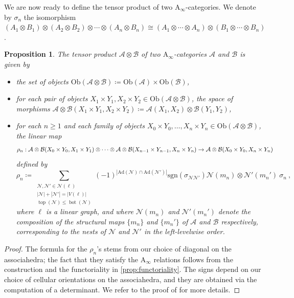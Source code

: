 \documentclass[twoside, 12pt]{amsart}
\newtheorem{proposition}[definition]{Proposition}
\theoremstyle{remark}
\DeclareMathOperator{\tp}{top}
\DeclareMathOperator{\bm}{bot}
\newcommand{\cat}[1]{\mathcal{#1}}
\newcommand{\gra}{\ell}
\begin{document}
We are now ready to define the tensor product of two $\mathrm{A}_\infty$-categories. We denote by $\sigma_n$ the isomorphism $(A_1 \otimes B_1)\otimes (A_2 \otimes B_2) \otimes \cdots \otimes (A_n \otimes B_n) \cong (A_1 \otimes \cdots \otimes A_n) \otimes (B_1 \otimes \cdots \otimes B_n)$. 

\begin{proposition} The \emph{tensor product} $\cat{A}\otimes \cat{B}$ of two $\mathrm{A}_\infty$-categories $\cat{A}$ and $\cat{B}$ is given by 
\begin{itemize}
  \item the set of objects $\mathrm{Ob}(\cat{A}\otimes \cat{B})\coloneqq \mathrm{Ob}(\cat{A})\times\mathrm{Ob}(\cat{B})$,
  \item for each pair of objects $X_1\times Y_1,X_2\times Y_2 \in \mathrm{Ob}(\cat{A}\otimes \cat{B})$, the space of morphisms $\cat{A}\otimes \cat{B}(X_1\times Y_1,X_2\times Y_2)\coloneqq \cat{A}(X_1,X_2)\otimes\cat{B}(Y_1,Y_2)$,
  \item for each $n\geq 1$ and each family of objects $X_0\times Y_0,\ldots,X_n\times Y_n \in \mathrm{Ob}(\cat{A}\otimes \cat{B})$, the linear map 
  \begin{equation*}
  \rho_n : \cat{A}\otimes \cat{B}(X_0\times Y_0,X_1\times Y_1) \otimes  \cdots  \otimes \cat{A}\otimes \cat{B}(X_{n-1}\times Y_{n-1},X_n\times Y_n) \\ 
   \to \cat{A}\otimes \cat{B}(X_0\times Y_0,X_n\times Y_n) 
\end{equation*} 
defined by 
\[\rho_n \coloneqq 
\sum_{\substack{
  \mathcal{N},\mathcal{N}' \in \mathcal{N}(\gra) \\ 
  |\mathcal{N}|+|\mathcal{N}'|=|V(\gra)| \\
  \tp(\mathcal{N}) \leq \bm(\mathcal{N})
}}
(-1)^{|\mathrm{Ad}(\mathcal{N})\cap \mathrm{Ad}(\mathcal{N}')|}\mathrm{sgn}(\sigma_{\mathcal{N}\mathcal{N}'})\mathcal{N}(m_n)\otimes \mathcal{N}'(m_n') \ \sigma_n \ ,\] 
where $\gra$ is a linear graph, and where $\mathcal{N}(m_n)$ and $\mathcal{N}'(m_n')$ denote the composition of the structural maps $\{m_n\}$ and $\{m_n'\}$ of $\cat{A}$ and $\cat{B}$ respectively, corresponding to the nests of $\mathcal{N}$ and $\mathcal{N}'$ in the left-levelwise order.
\end{itemize}
\end{proposition}

\begin{proof}
  The formula for the $\rho_n$'s stems from our choice of diagonal on the associahedra; the fact that they satisfy the $\mathrm{A}_\infty$ relations follows from the construction and the functoriality in \cref{prop:functoriality}. The signs depend on our choice of cellular orientations on the associahedra, and they are obtained via the computation of a determinant. We refer to the proof of \cite[Proposition 4.27]{LA21} for more details. 
\end{proof}
\end{document}
